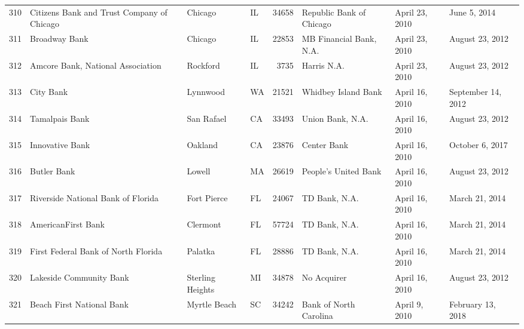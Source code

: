 \begin{tabular}{llllrlll}
310 &         Citizens Bank and Trust Company of Chicago &             Chicago &  IL &  34658 &                           Republic Bank of Chicago &      April 23, 2010 &        June 5, 2014 \\
311 &                                      Broadway Bank &             Chicago &  IL &  22853 &                            MB Financial Bank, N.A. &      April 23, 2010 &     August 23, 2012 \\
312 &                  Amcore Bank, National Association &            Rockford &  IL &   3735 &                                        Harris N.A. &      April 23, 2010 &     August 23, 2012 \\
313 &                                          City Bank &            Lynnwood &  WA &  21521 &                                Whidbey Island Bank &      April 16, 2010 &  September 14, 2012 \\
314 &                                     Tamalpais Bank &          San Rafael &  CA &  33493 &                                   Union Bank, N.A. &      April 16, 2010 &     August 23, 2012 \\
315 &                                    Innovative Bank &             Oakland &  CA &  23876 &                                        Center Bank &      April 16, 2010 &     October 6, 2017 \\
316 &                                        Butler Bank &              Lowell &  MA &  26619 &                               People's United Bank &      April 16, 2010 &     August 23, 2012 \\
317 &                 Riverside National Bank of Florida &         Fort Pierce &  FL &  24067 &                                      TD Bank, N.A. &      April 16, 2010 &      March 21, 2014 \\
318 &                                 AmericanFirst Bank &            Clermont &  FL &  57724 &                                      TD Bank, N.A. &      April 16, 2010 &      March 21, 2014 \\
319 &                First Federal Bank of North Florida &             Palatka &  FL &  28886 &                                      TD Bank, N.A. &      April 16, 2010 &      March 21, 2014 \\
320 &                            Lakeside Community Bank &    Sterling Heights &  MI &  34878 &                                        No Acquirer &      April 16, 2010 &     August 23, 2012 \\
321 &                          Beach First National Bank &        Myrtle Beach &  SC &  34242 &                             Bank of North Carolina &       April 9, 2010 &   February 13, 2018 \\

\end{tabular}
